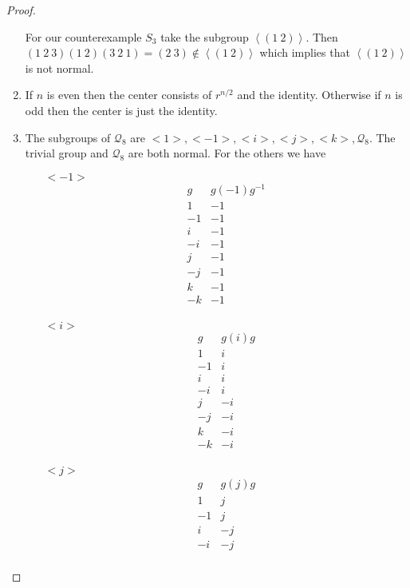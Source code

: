 \documentclass[10pt]{article}
\theoremstyle{plain}
\theoremstyle{remark}
\begin{document}
\begin{proof}
\begin{enumerate}
    For our counterexample $S_3$ take the subgroup $\left<(1\ 2)\right>$. Then
    $(1\ 2\ 3)(1\ 2)(3\ 2\ 1)=(2\ 3)\notin \left<(1\ 2)\right>$ which implies that
    $\left<(1\ 2)\right>$ is not normal.
  \item If $n$ is even then the center consists of $r^{n/2}$ and the identity. Otherwise
    if $n$ is odd then the center is just the identity.
  \item The subgroups of $\mathcal{Q}_8$ are $<1>,<-1>,<i>,<j>,<k>,\mathcal{Q}_8$. The
    trivial group and $\mathcal{Q}_8$ are both normal. For the others we have
    \begin{itemize}
    \item[$<-1>$]
      \[
        \begin{array}{c|c}
          g & g(-1)g^{-1}\\
          \hline 
          1 & -1\\
          -1 & -1\\
          i & -1\\
          -i & -1\\
          j & -1\\
          -j & -1\\
          k & -1\\
          -k & -1\\
        \end{array}
      \]
    \item[$<i>$]
      \[
        \begin{array}{c|c}
          g & g(i)g\\
          \hline 
          1 & i\\
          -1 & i\\
          i & i\\
          -i & i\\
          j & -i\\
          -j & -i\\
          k & -i\\
          -k & -i\\
        \end{array}
      \]
    \item[$<j>$]
      \[
        \begin{array}{c|c}
          g & g(j)g\\
          \hline 
          1 & j\\
          -1 & j\\
          i & -j\\
          -i & -j\\

\end{array}\]
\end{itemize}
\end{enumerate}
\end{proof}
\end{document}
